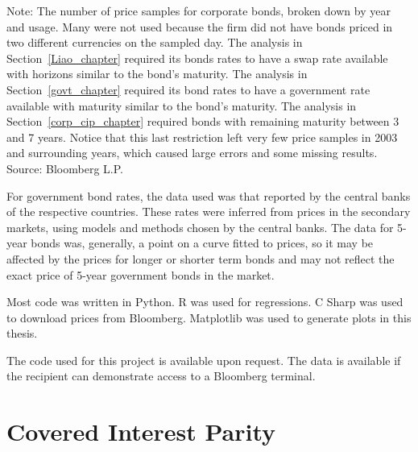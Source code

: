 \begin{table}[p]
\raggedright 
 Note: {\small The number of price samples for corporate bonds, broken down by year and usage.  Many were not used because the firm did not have bonds priced in two different currencies on the sampled day.  The analysis in Section~\ref{Liao_chapter} required its bonds rates to have a swap rate available with horizons similar to the bond's maturity.  The analysis in Section~\ref{govt_chapter} required its bond rates to have a government rate available with maturity similar to the bond's maturity.  The analysis in Section~\ref{corp_cip_chapter} required bonds with remaining maturity between 3 and 7 years.  Notice that this last restriction left very few price samples in 2003 and surrounding years, which caused large errors and some missing results.  }
\newline Source: Bloomberg L.P.
\end{table}



For government bond rates, the data used was that reported by the central banks of the respective countries.\cite{USD_central_bank, AUD_central_bank, CAD_central_bank, CHF_central_bank, EUR_central_bank, GBP_central_bank, JPY_central_bank, NOK_central_bank, NZD_central_bank, SEK_central_bank}  These rates were inferred from prices in the secondary markets, using models and methods chosen by the central banks.  The data for 5-year bonds was, generally, a point on a curve fitted to prices, so it may be affected by the prices for longer or shorter term bonds and may not reflect the exact price of 5-year government bonds in the market.  




Most code was written in Python.  R was used for regressions.  C Sharp was used to download prices from Bloomberg.  Matplotlib was used to generate plots in this thesis.  


The code used for this project is available upon request.  The data is available if the recipient can demonstrate access to a Bloomberg terminal.



\section{Covered Interest Parity } \label{CIP_chapter}

